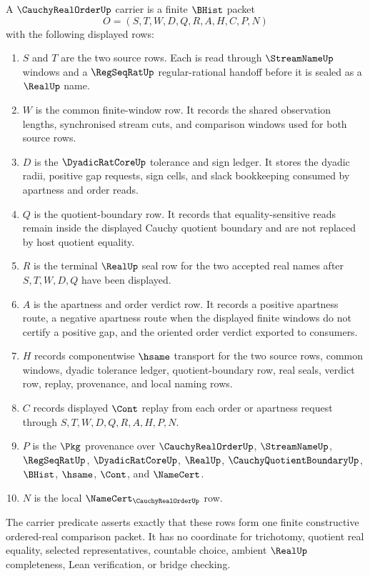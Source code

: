 \begin{definition}
\label{def:cauchy-real-order-carrier}
A $\CauchyRealOrderUp$ carrier is a finite $\BHist$ packet
$$
O=(S,T,W,D,Q,R,A,H,C,P,N)
$$
with the following displayed rows:
\begin{enumerate}
\item $S$ and $T$ are the two source rows. Each is read through $\StreamNameUp$ windows and a $\RegSeqRatUp$ regular-rational handoff before it is sealed as a $\RealUp$ name.
\item $W$ is the common finite-window row. It records the shared observation lengths, synchronised stream cuts, and comparison windows used for both source rows.
\item $D$ is the $\DyadicRatCoreUp$ tolerance and sign ledger. It stores the dyadic radii, positive gap requests, sign cells, and slack bookkeeping consumed by apartness and order reads.
\item $Q$ is the quotient-boundary row. It records that equality-sensitive reads remain inside the displayed Cauchy quotient boundary and are not replaced by host quotient equality.
\item $R$ is the terminal $\RealUp$ seal row for the two accepted real names after $S,T,W,D,Q$ have been displayed.
\item $A$ is the apartness and order verdict row. It records a positive apartness route, a negative apartness route when the displayed finite windows do not certify a positive gap, and the oriented order verdict exported to consumers.
\item $H$ records componentwise $\hsame$ transport for the two source rows, common windows, dyadic tolerance ledger, quotient-boundary row, real seals, verdict row, replay, provenance, and local naming rows.
\item $C$ records displayed $\Cont$ replay from each order or apartness request through $S,T,W,D,Q,R,A,H,P,N$.
\item $P$ is the $\Pkg$ provenance over $\CauchyRealOrderUp$, $\StreamNameUp$, $\RegSeqRatUp$, $\DyadicRatCoreUp$, $\RealUp$, $\CauchyQuotientBoundaryUp$, $\BHist$, $\hsame$, $\Cont$, and $\NameCert$.
\item $N$ is the local $\NameCert_{\CauchyRealOrderUp}$ row.
\end{enumerate}
The carrier predicate asserts exactly that these rows form one finite constructive ordered-real comparison packet. It has no coordinate for trichotomy, quotient real equality, selected representatives, countable choice, ambient $\RealUp$ completeness, Lean verification, or bridge checking.
\end{definition}

